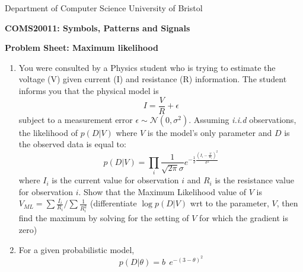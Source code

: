 \documentclass [11pt]{article}
\newcommand{\answer}[1]{}
\begin{document}
Department of Computer Science \hfill University of Bristol

\begin{center}
{\large\bf COMS20011: Symbols, Patterns and Signals}
\vspace{2ex}

{\large\bf Problem Sheet: Maximum likelihood}
\end{center}
\vspace{1ex}

\begin{enumerate}

\item You were consulted by a Physics student who is trying to estimate the voltage (V) given current (I) and resistance (R) information. The student informs you that the physical model is
\begin{equation*}
I = \frac{V}{R} + \epsilon
\end{equation*}
subject to a measurement error $\epsilon \sim \mathcal{N}(0, \sigma^2)$.
Assuming \textit{i.i.d} observations, the likelihood of $p(D | V)$ where $V$ is the model's only parameter and $D$ is the observed data is equal to:
\begin{equation*}
p(D|V) = \prod_i {\frac{1}{\sqrt{2 \pi} \sigma} e^{-\frac{1}{2}\frac{(I_i-\frac{V}{R_i})^2}{\sigma^2}}}
\end{equation*}
where $I_i$ is the current value for observation $i$ and $R_i$ is the resistance value for observation $i$. Show that the Maximum Likelihood value of $V$ is
$V_{ML} = \sum \frac{I_i}{R_i}/{\sum{\frac{1}{R_i^2}}} $  
(differentiate $\log p(D|V)$ wrt to the parameter, $V$, then find the maximum by solving for the setting of $V$ for which the gradient is zero)

\answer{
1. Take the natural logarithm: 
$\ln p(D|V) = N \ln \frac{1}{\sqrt{2 \pi} \sigma} + \sum_i -\frac{1}{2} \frac{(I_i - \frac{V}{R_i})^2}{\sigma^2}$

2. Take the derivative: 
$\frac{d}{dV} \ln p(D|V) = \frac{1}{\sigma^2} \sum_i \frac{1}{R_i} (I_i - \frac{V}{R_i})$

3. Find the solution by setting derivative to 0:
$-\frac{1}{\sigma^2} \sum_i \frac{1}{R_i} (I_i - \frac{V}{R_i}) = 0$\\
$\sum_i\frac{I_i}{R_i} - V_{ML}\sum_i{\frac{1}{R_i^2}} = 0$\\
$V_{ML} = \sum \frac{I_i}{R_i}/{\sum{\frac{1}{R_i^2}}}$
}



\item For a given probabilistic model,
\begin{equation*}
p(D | \theta) = b \ \ e^{-(3-\theta)^2}
\end{equation*}


\end{enumerate}
\end{document}
